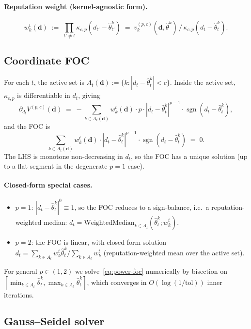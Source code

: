 \documentclass[11pt]{article}
\DeclareMathOperator{\sgn}{sgn}
\newcommand{\thetahat}{\hat{\theta}}
\newcommand{\db}{\bm{d}}
\begin{document}
\paragraph{Reputation weight (kernel-agnostic form).}
\[
w_k^t(\db) \;:=\; \prod_{t' \neq t} \kappa_{c, p}(d_{t'} - \thetahat^k_{t'})
\;=\; v_k^{(p, c)}(\db, \thetahat^k) \,/\, \kappa_{c, p}(d_t - \thetahat^k_t).
\]

\subsection{Coordinate FOC}
\label{sec:foc}

For each $t$, the active set is $A_t(\db) := \{k : |d_t - \thetahat^k_t| < c\}$.
Inside the active set, $\kappa_{c, p}$ is differentiable in $d_t$, giving
\[
\partial_{d_t} V^{(p, c)}(\db) \;=\;
- \sum_{k \in A_t(\db)} w_k^t(\db) \cdot p \cdot |d_t - \thetahat^k_t|^{p-1} \cdot \sgn(d_t - \thetahat^k_t),
\]
and the FOC is
\begin{equation}
\boxed{
\sum_{k \in A_t(\db)} w_k^t(\db) \cdot |d_t - \thetahat^k_t|^{p-1} \cdot \sgn(d_t - \thetahat^k_t) \;=\; 0.
}
\label{eq:power-foc}
\end{equation}
The LHS is monotone non-decreasing in $d_t$, so the FOC has a unique
solution (up to a flat segment in the degenerate $p = 1$ case).

\paragraph{Closed-form special cases.}
\begin{itemize}[nosep, leftmargin=*]
\item $p = 1$: $|d_t - \thetahat^k_t|^0 \equiv 1$, so the FOC reduces to
a sign-balance, i.e.\ a reputation-weighted median:
$d_t = \mathrm{WeightedMedian}_{k \in A_t}(\thetahat^k_t; w_k^t)$.
\item $p = 2$: the FOC is linear, with closed-form solution
$d_t = \sum_{k \in A_t} w_k^t \thetahat^k_t / \sum_{k \in A_t} w_k^t$
(reputation-weighted mean over the active set).
\end{itemize}
For general $p \in (1, 2)$ we solve~\eqref{eq:power-foc} numerically by
bisection on $[\min_{k \in A_t} \thetahat^k_t, \max_{k \in A_t} \thetahat^k_t]$,
which converges in $O(\log(1/\text{tol}))$ inner iterations.

\subsection{Gauss--Seidel solver}
\end{document}
